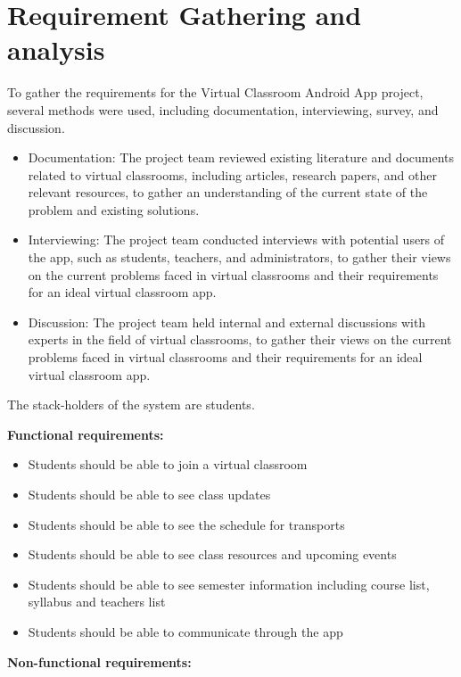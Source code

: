 \section{Requirement Gathering and analysis}\label{sec:rga}
To gather the requirements for the Virtual Classroom Android App project, several methods were used, including documentation, interviewing, survey, and discussion.
\begin{itemize}
\item Documentation: The project team reviewed existing literature and documents related to virtual classrooms, including articles, research papers, and other relevant resources, to gather an understanding of the current state of the problem and existing solutions.

\item Interviewing: The project team conducted interviews with potential users of the app, such as students, teachers, and administrators, to gather their views on the current problems faced in virtual classrooms and their requirements for an ideal virtual classroom app.


\item Discussion: The project team held internal and external discussions with experts in the field of virtual classrooms, to gather their views on the current problems faced in virtual classrooms and their requirements for an ideal virtual classroom app.
\end{itemize}
The stack-holders of the system are students.

\textbf{Functional requirements:}

\begin{itemize}
\item Students  should be able to join a virtual classroom
\item Students  should be able to see class updates
\item Students  should be able to see the schedule for transports
\item Students  should be able to see class resources and upcoming events
\item Students should be able to see semester information including course list, syllabus and teachers list
\item Students should be able to communicate through the app

\end{itemize}
\textbf{Non-functional requirements:}

